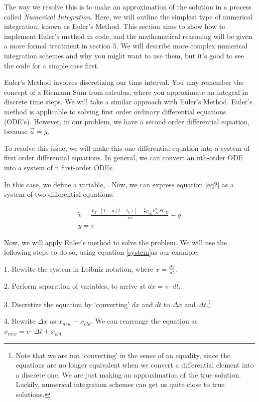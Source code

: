 \documentclass[12pt]{report}
\begin{document}
The way we resolve this is to make an approximation of the solution in a process called \textit{Numerical Integration. }Here, we will outline the simplest type of numerical integration, known as Euler’s Method. This section aims to show how to implement Euler’s method in code, and the mathematical reasoning will be given a more formal treatment in section 5. We will describe more complex numerical integration schemes and why you might want to use them, but it’s good to see the code for a simple case first.

Euler’s Method involves discretizing our time interval. You may remember the concept of a Riemann Sum from calculus, where you approximate an integral in discrete time steps. We will take a similar approach with Euler’s Method. Euler’s method is applicable to solving first order ordinary differential equations (ODE’s). However, in our problem, we have a second order differential equation, because $\vec{a}=\ddot{y}$.

To resolve this issue, we will make this one differential equation into a system of first order differential equations. In general, we can convert an nth-order ODE into a system of n first-order ODEs.

In this case, we define a variable, . Now, we can express equation \eqref{eq2} as a system of two differential equations:

\begin{gather}\label{system}
        \dot{v}=\frac{F_T \cdot [1-u(t-t_b)]-\frac{1}{2}\rho_{\infty}V_{\infty}^2SC_D}{m}-g\\
    \dot{y}=v
\end{gather}

Now, we will apply Euler’s method to solve the problem. We will use the following steps to do so, using equation \eqref{system}as our example:

1. Rewrite the system in Leibniz notation, where $\dot{x}=\frac{dx}{dt}$.

2. Perform separation of variables, to arrive at $dx=v\cdot dt$.

3. Discretize the equation by ‘converting’  $dx$ and $dt$ to $\Delta x$ and $\Delta t$.\footnote{Note that we are not ‘converting’ in the sense of an equality, since the equations are no longer equivalent when we convert a differential element into a discrete one. We are just making an approximation of the true solution. Luckily, numerical integration schemes can get us quite close to true solutions. }

4. Rewrite $\Delta x$ as $x_{new}-x_{old}$. We can rearrange the equation as $x_{new}=v\cdot \Delta t + x_{old}$
\end{document}
